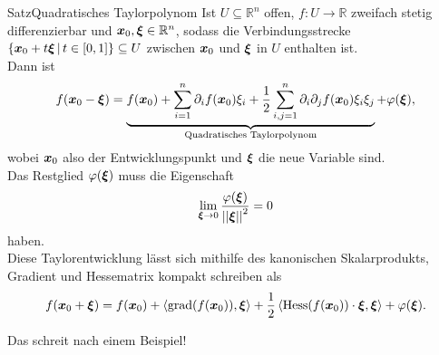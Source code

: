 \begin{Satz}
{Satz}{Quadratisches Taylorpolynom}
Ist $U\subseteq\mathbb{R}^n$ offen, $f:U\to\mathbb{R}$ zweifach stetig differenzierbar und $\xvec_0,\xivec\in\mathbb{R}^n$, sodass die Verbindungsstrecke $\Menge{\xvec_0+t\xivec}{t\in[0,1]}\subseteq U$ zwischen $\xvec_0$ und $\xivec$ in $U$ enthalten ist.\\
Dann ist
\begin{equation}
    f(\xvec_0-\xivec)=\underbrace{f(\xvec_0)+ \sum_{i=1}^n\partial_if(\xvec_0)\xi_i+\frac{1}{2}\sum_{i,j=1}^n\partial_i\partial_jf(\xvec_0)\xi_i\xi_j}_{\tx{Quadratisches Taylorpolynom}}+\varphi(\xivec),
\end{equation}
wobei $\xvec_0$ also der Entwicklungspunkt und $\xivec$ die neue Variable sind.\\
Das Restglied $\varphi(\xivec)$ muss die Eigenschaft 
\begin{equation*}
    \lim_{\xivec\to0}\frac{\varphi(\xivec)}{\Norm{\xivec}^2}=0
\end{equation*}
haben.\\
Diese Taylorentwicklung lässt sich mithilfe des kanonischen Skalarprodukts, Gradient und Hessematrix kompakt schreiben als
\begin{equation}\label{eq:09QuadTaylor}
    f(\xvec_0+\xivec)=f(\xvec_0)+\BiFo{\grad(f(\xvec_0)),\xivec}+\frac{1}{2}\BiFo{\Hess(f(\xvec_0))\cdot\xivec,\xivec}+\varphi(\xivec).
\end{equation}
\end{Satz}
Das schreit nach einem Beispiel!
